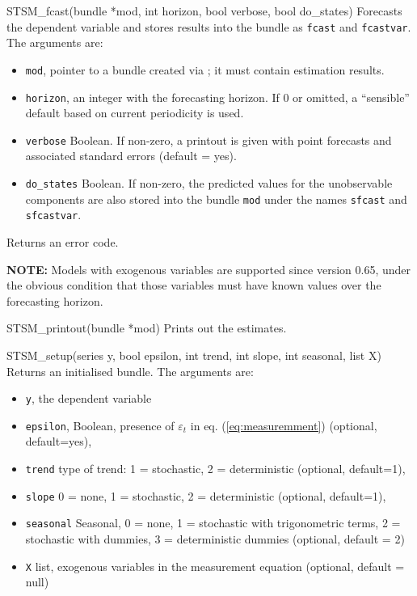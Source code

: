 \documentclass[a4paper,10pt]{article}
\begin{document}
\begin{funcdoc}{STSM\_fcast(bundle *mod, int horizon, bool verbose,
    bool do\_states)}
  Forecasts the dependent variable and stores results into the bundle
  as \texttt{fcast} and \texttt{fcastvar}. The arguments are:
  \begin{itemize}
  \item \texttt{mod}, pointer to a bundle created via
    ; it must contain estimation results.
  \item \texttt{horizon}, an integer with the forecasting horizon. If
    0 or omitted, a ``sensible'' default based on current periodicity
    is used. 
  \item \texttt{verbose} Boolean. If non-zero, a printout is given
    with point forecasts and associated standard errors (default = yes).
  \item \texttt{do\_states} Boolean. If non-zero, the predicted values
    for the unobservable components are also stored into the bundle
    \texttt{mod} under the names \texttt{sfcast} and
    \texttt{sfcastvar}.
  \end{itemize}
  
  Returns an error code.

  \textbf{NOTE:} Models with exogenous variables are supported since version
    0.65, under the 
    obvious condition that those variables must have known values over the 
    forecasting horizon.
  
\end{funcdoc}

\begin{funcdoc}{STSM\_printout(bundle *mod)}
  Prints out the estimates.
\end{funcdoc}

\begin{funcdoc}{STSM\_setup(series y, bool epsilon, int trend, 
      int slope, int seasonal, list X)}
  Returns an initialised bundle. The arguments are:
  \begin{itemize}
  \item \texttt{y}, the dependent variable
  \item \texttt{epsilon}, Boolean, presence of $\varepsilon_t$ in
    eq. (\ref{eq:measuremment}) (optional, default=yes),
  \item \texttt{trend} type of trend: 1 = stochastic, 2 =
    deterministic (optional, default=1),
  \item \texttt{slope}  0 = none, 1 = stochastic, 2 =
    deterministic (optional, default=1),
  \item \texttt{seasonal} Seasonal, 0 = none, 1 = stochastic with
    trigonometric terms, 2 = stochastic with dummies, 3 =
    deterministic dummies (optional, default = 2)
  \item \texttt{X} list, exogenous variables in the measurement
    equation (optional, default = null)
  \end{itemize}
\end{funcdoc}
\end{document}
